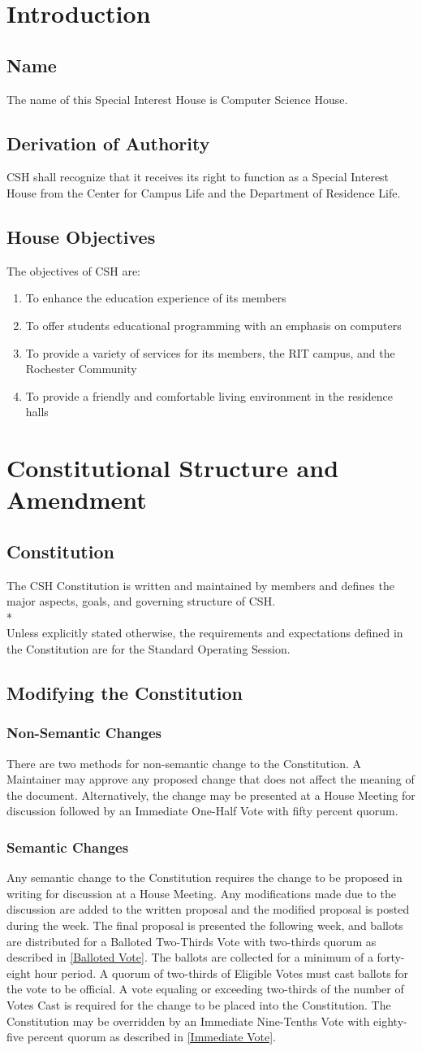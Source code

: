 \documentclass{article}
\newcommand{\article}[1]{\section{#1} \label{#1}}
\newcommand{\asection}[1]{\subsection{#1} \label{#1}}
\newcommand{\asubsection}[1]{\subsubsection{#1} \label{#1}}
\begin{document}
\article{Introduction}

\asection{Name}
The name of this Special Interest House is Computer Science House.

\asection{Derivation of Authority}
CSH shall recognize that it receives its right to function as a Special Interest House from the Center for Campus Life and the Department of Residence Life.

\asection{House Objectives}
The objectives of CSH are:
\begin{enumerate}
	\item To enhance the education experience of its members
	\item To offer students educational programming with an emphasis on computers
	\item To provide a variety of services for its members, the RIT campus, and the Rochester Community
	\item To provide a friendly and comfortable living environment in the residence halls
\end{enumerate}

\article{Constitutional Structure and Amendment}

\asection{Constitution}
The CSH Constitution is written and maintained by members and defines the major aspects, goals, and governing structure of CSH.
\\*\\
Unless explicitly stated otherwise, the requirements and expectations defined in the Constitution are for the Standard Operating Session.

\subsection{Modifying the Constitution}
\asubsection{Non-Semantic Changes}
There are two methods for non-semantic change to the Constitution.
A Maintainer may approve any proposed change that does not affect the meaning of the document.
Alternatively, the change may be presented at a House Meeting for discussion followed by an Immediate One-Half Vote with fifty percent quorum.

\asubsection{Semantic Changes}
Any semantic change to the Constitution requires the change to be proposed in writing for discussion at a House Meeting.
Any modifications made due to the discussion are added to the written proposal and the modified proposal is posted during the week.
The final proposal is presented the following week, and ballots are distributed for a Balloted Two-Thirds Vote with two-thirds quorum as described in \ref{Balloted Vote}.
The ballots are collected for a minimum of a forty-eight hour period.
A quorum of two-thirds of Eligible Votes must cast ballots for the vote to be official.
A vote equaling or exceeding two-thirds of the number of Votes Cast is required for the change to be placed into the Constitution.
The Constitution may be overridden by an Immediate Nine-Tenths Vote with eighty-five percent quorum as described in \ref{Immediate Vote}.
\end{document}
